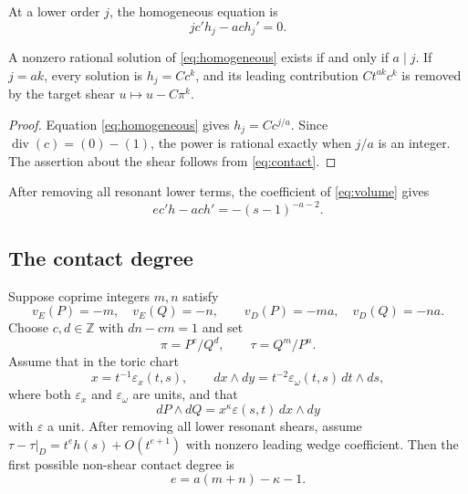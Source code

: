 \documentclass[11pt,reqno]{amsart}
\begin{document}
At a lower order \(j\), the homogeneous equation is
\begin{equation}
\label{eq:homogeneous}
jc'h_j-ach_j'=0.
\end{equation}

\begin{lemma}
\label{lem:resonance}
A nonzero rational solution of \eqref{eq:homogeneous} exists if and only if
\(a\mid j\).  If \(j=ak\), every solution is \(h_j=Cc^k\), and its
leading contribution \(Ct^{ak}c^k\) is removed by the target shear
\(u\mapsto u-C\pi^k\).
\end{lemma}

\begin{proof}
Equation \eqref{eq:homogeneous} gives \(h_j=Cc^{j/a}\).  Since
\(\operatorname{div}(c)=(0)-(1)\), the power is rational exactly when
\(j/a\) is an integer.  The assertion about the shear follows from
\eqref{eq:contact}.
\end{proof}

After removing all resonant lower terms, the coefficient of
\eqref{eq:volume} gives
\begin{equation}
\label{eq:transport-equation}
ec'h-ach'=-(s-1)^{-a-2}.
\end{equation}

\subsection{The contact degree}

\begin{proposition}
\label{prop:contact}
Suppose coprime integers \(m,n\) satisfy
\[
v_E(P)=-m,\quad v_E(Q)=-n,\qquad
v_D(P)=-ma,\quad v_D(Q)=-na.
\]
Choose \(c,d\in\mathbb Z\) with \(dn-cm=1\) and set
\[
\pi=P^c/Q^d,\qquad \tau=Q^m/P^n.
\]
Assume that in the toric chart
\[
 x=t^{-1}\varepsilon_x(t,s),\qquad
 dx\wedge dy=t^{-2}\varepsilon_\omega(t,s)\,dt\wedge ds,
\]
where both \(\varepsilon_x\) and \(\varepsilon_\omega\) are units, and that
\[
 dP\wedge dQ=x^\kappa\varepsilon(s,t)\,dx\wedge dy
\]
with \(\varepsilon\) a unit.  After removing all lower resonant shears,
assume
\(\tau-\tau|_D=t^e h(s)+O(t^{e+1})\) with nonzero leading wedge
coefficient.  Then the first possible non-shear contact degree is
\begin{equation}
\label{eq:contact-degree}
e=a(m+n)-\kappa-1.
\end{equation}
\end{proposition}
\end{document}
